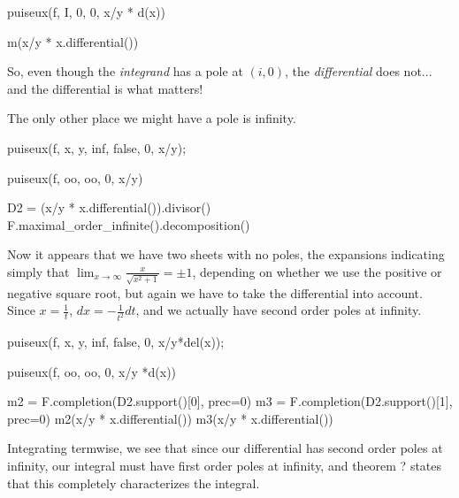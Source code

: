 \begin{sageblock}[riemannroch]
puiseux(f, I, 0, 0, x/y * d(x))
\end{sageblock}

\begin{sageblock}[riemannroch2]
m(x/y * x.differential())
\end{sageblock}

So, even though the {\it integrand} has a pole at $(i,0)$, the {\it
differential} does not... and the differential is what matters!

The only other place we might have a pole is infinity.

\begin{maximablock}
puiseux(f, x, y, inf, false, 0, x/y);
\end{maximablock}

\begin{sageblock}[riemannroch]
puiseux(f, oo, oo, 0, x/y)
\end{sageblock}

\begin{sageblock}[riemannroch2]
D2 = (x/y * x.differential()).divisor()
F.maximal_order_infinite().decomposition()
\end{sageblock}

Now it appears that we have two sheets with no poles, the expansions indicating simply
that $\lim_{x\to\infty}\frac{x}{\sqrt{x^2+1}} = \pm 1$, depending
on whether we use the positive or negative square root,
but again
we have to take the differential into account.  Since $x=\frac{1}{t}$,
$dx=-\frac{1}{t^2} dt$, and we actually have second order poles
at infinity.

\begin{maximablock}
puiseux(f, x, y, inf, false, 0, x/y*del(x));
\end{maximablock}

\begin{sageblock}[riemannroch]
puiseux(f, oo, oo, 0, x/y *d(x))
\end{sageblock}

\begin{sageblock}[riemannroch2]
m2 = F.completion(D2.support()[0], prec=0)
m3 = F.completion(D2.support()[1], prec=0)
m2(x/y * x.differential())
m3(x/y * x.differential())
\end{sageblock}

Integrating termwise, we see that since our differential has second
order poles at infinity, our integral must have first order poles
at infinity, and theorem ? states that this completely
characterizes the integral.

